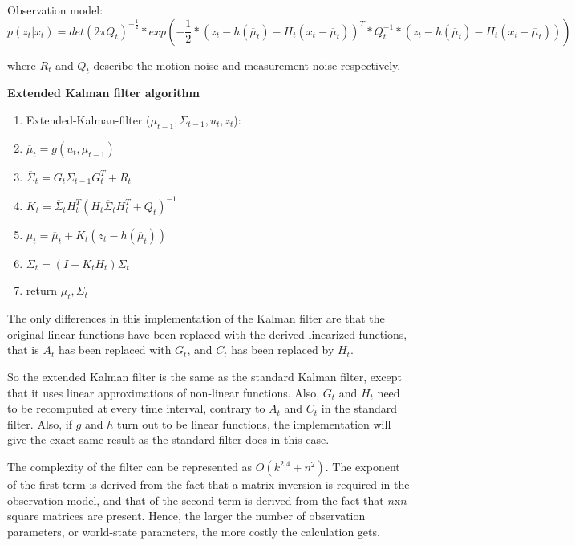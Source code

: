 \documentclass[a4paper]{article}
\begin{document}
Observation model:
\begin{equation*}
    p(z_t| x_t) = det(2\pi Q_t)^{-\frac{1}{2}} * exp(-\frac{1}{2} * (z_t - h(\overline{\mu}_t) - H_t (x_t - \overline{\mu}_t))^T * Q_t^{-1} * (z_t - h(\overline{\mu}_t) - H_t (x_t - \overline{\mu}_t)) )
\end{equation*}

where $R_t$ and $Q_t$ describe the motion noise and measurement noise respectively.

\textbf{Extended Kalman filter algorithm}

\begin{enumerate}
    \item Extended-Kalman-filter ($\mu_{t-1}, \Sigma_{t-1}, u_t, z_t$):
    \item \hspace{2em} $\overline{\mu}_t = g(u_t, \mu_{t-1})$
    \item \hspace{2em} $\overline{\Sigma}_t = G_t \Sigma_{t-1} G_t^T + R_t$
    \item \hspace{2em} $K_t = \overline{\Sigma}_t H_t^T (H_t \overline{\Sigma}_t H_t^T + Q_t) ^{-1}$
    \item \hspace{2em} $\mu_t = \overline{\mu}_t + K_t(z_t - h(\overline{\mu}_t))$
    \item \hspace{2em} $\Sigma_t = (I - K_t H_t) \overline{\Sigma}_t$
    \item \hspace{2em} return $\mu_t, \Sigma_t$
\end{enumerate}

The only differences in this implementation of the Kalman filter are that the original linear functions have been replaced with the derived linearized functions, that is $A_t$ has been replaced with $G_t$, and $C_t$ has been replaced by $H_t$.

So the extended Kalman filter is the same as the standard Kalman filter, except that it uses linear approximations of non-linear functions. Also, $G_t$ and $H_t$ need to be recomputed at every time interval, contrary to $A_t$ and $C_t$ in the standard filter. Also, if $g$ and $h$ turn out to be linear functions, the implementation will give the exact same result as the standard filter does in this case.

The complexity of the filter can be represented as $O(k^{2.4} + n^2)$. The exponent of the first term is derived from the fact that a matrix inversion is required in the observation model, and that of the second term is derived from the fact that $n$x$n$ square matrices are present. Hence, the larger the number of observation parameters, or world-state parameters, the more costly the calculation gets.
\end{document}
